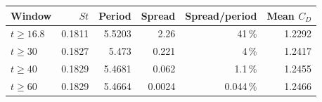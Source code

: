 \begin{tabular}{lrrrrr}
\toprule
Window & $St$ & Period & Spread & Spread/period & Mean $C_D$ \\
\midrule
$t\ge 16.8$ & \num{0.1811} & \num{5.5203} & \num{2.26} & \num{41}\,\% & \num{1.2292} \\
$t\ge 30$ & \num{0.1827} & \num{5.473} & \num{0.221} & \num{4}\,\% & \num{1.2417} \\
$t\ge 40$ & \num{0.1829} & \num{5.4681} & \num{0.062} & \num{1.1}\,\% & \num{1.2455} \\
$t\ge 60$ & \num{0.1829} & \num{5.4664} & \num{0.0024} & \num{0.044}\,\% & \num{1.2466} \\
\bottomrule
\end{tabular}

